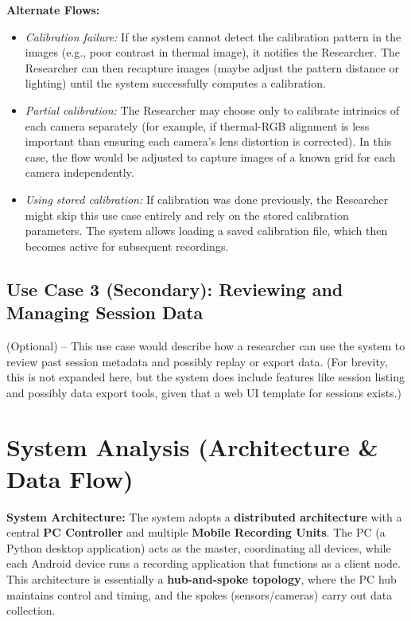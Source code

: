 \textbf{Alternate Flows:}
\begin{itemize}
    \item \emph{Calibration failure:} If the system cannot detect the calibration pattern in the images (e.g., poor contrast in thermal image), it notifies the Researcher. The Researcher can then recapture images (maybe adjust the pattern distance or lighting) until the system successfully computes a calibration.
    \item \emph{Partial calibration:} The Researcher may choose only to calibrate intrinsics of each camera separately (for example, if thermal-RGB alignment is less important than ensuring each camera's lens distortion is corrected). In this case, the flow would be adjusted to capture images of a known grid for each camera independently.
    \item \emph{Using stored calibration:} If calibration was done previously, the Researcher might skip this use case entirely and rely on the stored calibration parameters. The system allows loading a saved calibration file, which then becomes active for subsequent recordings.
\end{itemize}

\subsection{Use Case 3 (Secondary): Reviewing and Managing Session Data}
(Optional) -- This use case would describe how a researcher can use the system to review past session metadata and possibly replay or export data. (For brevity, this is not expanded here, but the system does include features like session listing and possibly data export tools, given that a web UI template for sessions exists.)


\section{System Analysis (Architecture \& Data Flow)}
\label{sec:system-analysis}
\textbf{System Architecture:} The system adopts a \textbf{distributed architecture} with a central \textbf{PC Controller} and multiple \textbf{Mobile Recording Units}. The PC (a Python desktop application) acts as the master, coordinating all devices, while each Android device runs a recording application that functions as a client node. This architecture is essentially a \textbf{hub-and-spoke topology}, where the PC hub maintains control and timing, and the spokes (sensors/cameras) carry out data collection.

